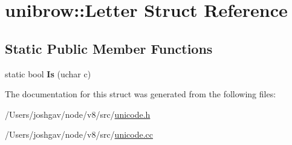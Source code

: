 \hypertarget{structunibrow_1_1_letter}{}\section{unibrow\+:\+:Letter Struct Reference}
\label{structunibrow_1_1_letter}
\subsection*{Static Public Member Functions}
\begin{DoxyCompactItemize}
\item 
static bool {\bfseries Is} (uchar c)\hypertarget{structunibrow_1_1_letter_a102f3b1d0b14704846a16f95485c5208}{}\label{structunibrow_1_1_letter_a102f3b1d0b14704846a16f95485c5208}

\end{DoxyCompactItemize}


The documentation for this struct was generated from the following files\+:\begin{DoxyCompactItemize}
\item 
/\+Users/joshgav/node/v8/src/\hyperlink{unicode_8h}{unicode.\+h}\item 
/\+Users/joshgav/node/v8/src/\hyperlink{unicode_8cc}{unicode.\+cc}\end{DoxyCompactItemize}
